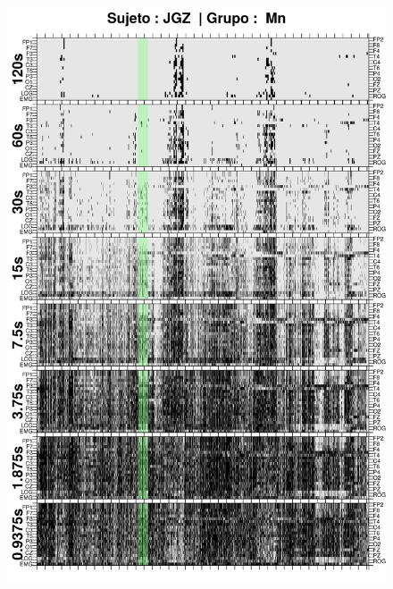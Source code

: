 
\begin{figure}
\centering
\includegraphics[width=0.9\linewidth]
{./img_ejemplos/JGMN6SUE_comp_est_.png} 
\end{figure}

